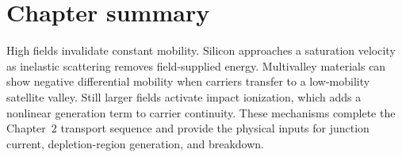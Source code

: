 \section{Chapter summary}

High fields invalidate constant mobility.  Silicon approaches a saturation
velocity as inelastic scattering removes field-supplied energy.  Multivalley
materials can show negative differential mobility when carriers transfer to a
low-mobility satellite valley.  Still larger fields activate impact ionization,
which adds a nonlinear generation term to carrier continuity.  These mechanisms
complete the Chapter~2 transport sequence and provide the physical inputs for
junction current, depletion-region generation, and breakdown.
